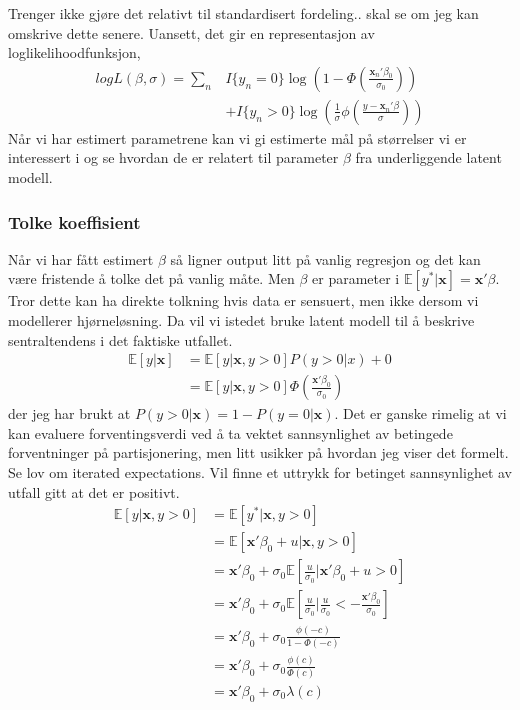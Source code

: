 Trenger ikke gjøre det relativt til standardisert fordeling.. skal se om jeg kan omskrive dette senere. Uansett, det gir en representasjon av loglikelihoodfunksjon,
\begin{align}
logL(\beta,\sigma) = \sum_n & I\{y_n = 0\}\log\left(1-\Phi\left(\frac{\mathbf{x}_n'\beta_0}{\sigma_0}\right)\right) \\
&+ I\{y_n>0\} \log\left(\frac{1}{\sigma}\phi\left(\frac{y-\mathbf{x}_n'\beta}{\sigma}\right)\right)
\end{align}
Når vi har estimert parametrene kan vi gi estimerte mål på størrelser vi er interessert i og se hvordan de er relatert til parameter $\beta$ fra underliggende latent modell.
\subsubsection{Tolke koeffisient}
Når vi har fått estimert $\beta$ så ligner output litt på vanlig regresjon og det kan være fristende å tolke det på vanlig måte. Men $\beta$ er parameter i $\mathbb{E}[y^*|\mathbf{x}] =\mathbf{x}'\beta$. Tror dette kan ha direkte tolkning hvis data er sensuert, men ikke dersom vi modellerer hjørneløsning. Da vil vi istedet bruke latent modell til å beskrive sentraltendens i det faktiske utfallet.
\begin{align}
\mathbb{E}[y|\mathbf{x}] &= \mathbb{E}[y|\mathbf{x},y>0]P(y>0|x) + 0 \\
&=\mathbb{E}[y|\mathbf{x},y>0]\Phi\left(\frac{\mathbf{x}'\beta_0}{\sigma_0}\right)
\end{align}
der jeg har brukt at $P(y>0|\mathbf{x}) = 1-P(y=0|\mathbf{x})$. Det er ganske rimelig at vi kan evaluere forventingsverdi ved å ta vektet sannsynlighet av betingede forventninger på partisjonering, men litt usikker på hvordan jeg viser det formelt. Se lov om iterated expectations. Vil finne et uttrykk for betinget sannsynlighet av utfall gitt at det er positivt.
\begin{align}
\mathbb{E}[y|\mathbf{x},y>0] &= \mathbb{E}[y^*|\mathbf{x},y>0] \\
&=\mathbb{E}[\mathbf{x}'\beta_0+u|\mathbf{x},y>0] \\
&=\mathbf{x}'\beta_0 + \sigma_0\mathbb{E}\left[\frac{u}{\sigma_0}|\mathbf{x}'\beta_0+u>0\right] \\
&=\mathbf{x}'\beta_0 + \sigma_0\mathbb{E}\left[\frac{u}{\sigma_0}| \frac{u}{\sigma_0}<-\frac{\mathbf{x}'\beta_0}{\sigma_0}\right] \\
&=\mathbf{x}'\beta_0 + \sigma_0\frac{\phi(-c)}{1-\Phi(-c)} \\
&=\mathbf{x}'\beta_0 + \sigma_0\frac{\phi(c)}{\Phi(c)} \\
&=\mathbf{x}'\beta_0 + \sigma_0\lambda(c)
\end{align}
